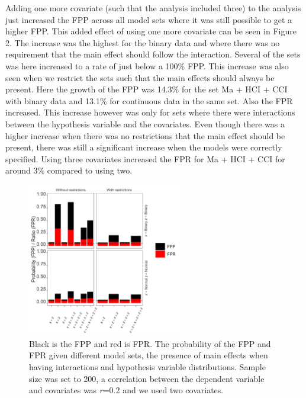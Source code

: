Adding one more covariate (such that the analysis included three) to the analysis just increased the FPP across all model sets where it was still possible to get a higher FPP. This added effect of using one more covariate can be seen in Figure 2. The increase was the highest for the binary data and where there was no requirement that the main effect should follow the interaction. Several of the sets was here increased to a rate of just below a 100\% FPP. This increase was also seen when we restrict the sets such that the main effects should always be present. Here the growth of the FPP was 14.3\% for the set Ma + HCI + CCI with binary data and 13.1\% for continuous data in the same set. Also the FPR increased. This increase however was only for sets where there were interactions between the hypothesis variable and the covariates. Even though there was a higher increase when there was no restrictions that the main effect should be present, there was still a significant increase when the models were correctly specified. Using three covariates increased the FPR for Ma + HCI + CCI for around 3\% compared to using two. 

\begin{figure}[t]
\includegraphics[width=0.6\textwidth]{R/Analysis/Result/Figures/Figure1A.jpeg}
\centering
\caption{Black is the FPP and red is FPR. The probability of the FPP and FPR given different model sets, the presence of main effects when having interactions and hypothesis variable distributions. Sample size was set to 200, a correlation between the dependent variable and covariates was \textit{r}=0.2 and we used two covariates.}
\label{fig:mainfigure}
\end{figure}

